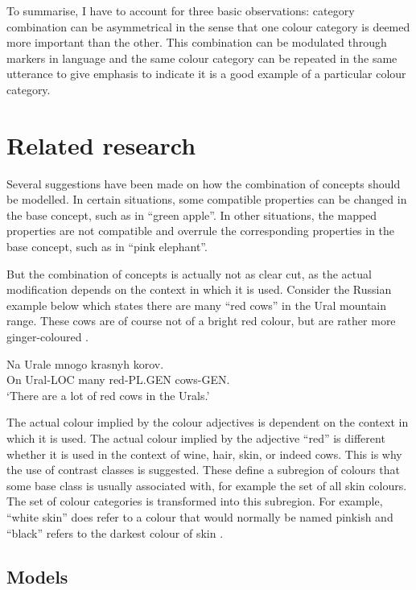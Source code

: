 To summarise, I have to account for three basic observations: category
combination can be asymmetrical in the sense that one colour category
is deemed more important than the other. This combination can be
modulated through markers in language and the same colour category can
be repeated in the same utterance to give emphasis to indicate it is a
good example of a particular colour category.

\section{Related research}
\label{s:ccs-related-research}

Several suggestions have been made on how the combination of concepts
should be modelled. In certain situations, some compatible properties
can be changed in the base concept, such as in ``green apple''. In
other situations, the mapped properties are not compatible and
overrule the corresponding properties in the base concept, such as in
``pink elephant''.

But the combination of concepts is actually not as clear cut, as the
actual modification depends on the context in which it is
used. Consider the Russian example below which states there are many
``red cows'' in the Ural mountain range. These cows are of course not
of a bright red colour, but are rather more ginger-coloured
\citep{tribushinina08cognitive}.

\ea
\gll Na Urale mnogo krasnyh korov.\\
On Ural-LOC many red-PL.GEN cows-GEN.\\
\glt `There are a lot of red cows in the Urals.'\\
\z


The actual colour implied by the colour adjectives is dependent on
the context in which it is used. The actual colour implied by the
adjective ``red'' is different whether it is used in the context of
wine, hair, skin, or indeed cows. This is why the use of contrast
classes is suggested. These define a subregion of colours that some
base class is usually associated with, for example the set of all skin
colours. The set of colour categories is transformed into this
subregion. For example, ``white skin'' does refer to a colour that
would normally be named pinkish and ``black'' refers to the darkest
colour of skin \citep{gardenfors04conceptual}.

\subsection{Models}

